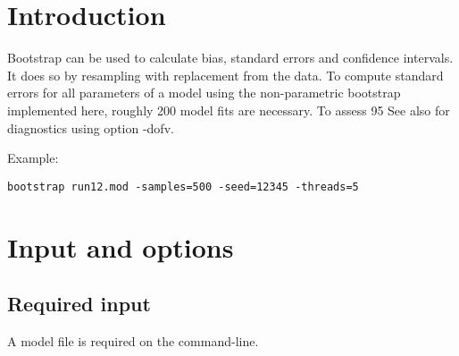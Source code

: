



\maketitle
\newcommand{\guidetoolname}{bootstrap}


\section{Introduction}

Bootstrap can be used to calculate bias, standard errors and confidence intervals. It does so by resampling with replacement from the data. To compute standard errors for all parameters of a model using the non-parametric bootstrap
      implemented here, roughly 200 model fits are necessary. To assess
      95%
See also \cite{Niebecker} for diagnostics using option -dofv.

Example:
\begin{verbatim}
bootstrap run12.mod -samples=500 -seed=12345 -threads=5
\end{verbatim}

\section{Input and options}

\subsection{Required input}
A model file is required on the command-line.

